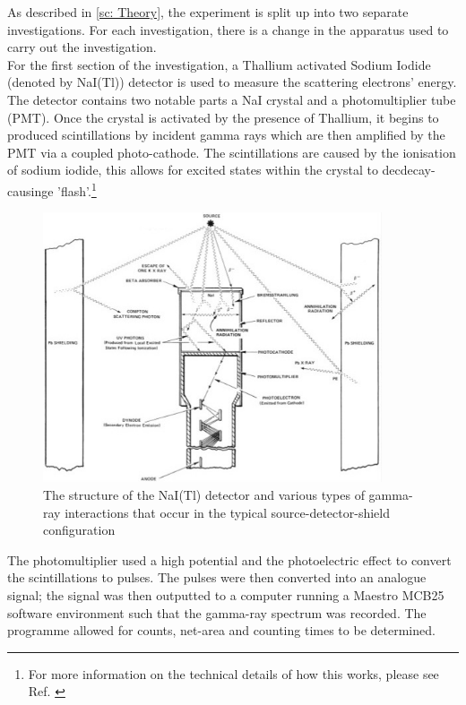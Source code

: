 As described in \cref{sc: Theory}, the experiment is split up into two separate investigations. For each investigation, there is a change in the apparatus used to carry out the investigation. \\ 

For the first section of the investigation, a Thallium activated Sodium Iodide (denoted by NaI(Tl)) detector is used to measure the scattering electrons' energy. The detector contains two notable parts a NaI crystal and a photomultiplier tube (PMT). Once the crystal is activated by the presence of Thallium, it begins to produced scintillations by incident gamma rays which are then amplified by the PMT via a coupled photo-cathode. The scintillations are caused by the ionisation of sodium iodide, this allows for excited states within the crystal to decdecay-causinge 'flash'.\footnote{For more information on the technical details of how this works, please see Ref. \cite{an}} 

\begin{figure}[h!]
    \centering
    \includegraphics[width = 10cm]{Images/Nai.jpg}
    \caption{The structure of the NaI(Tl) detector and various types of gamma-ray interactions that occur in the typical source-detector-shield configuration \cite{an}}
\end{figure}

The photomultiplier used a high potential and the photoelectric effect to convert the scintillations to pulses. The pulses were then converted into an analogue signal; the signal was then outputted to a computer running a Maestro MCB25 software environment such that the gamma-ray spectrum was recorded. The programme allowed for counts, net-area and counting times to be determined. \\ 

